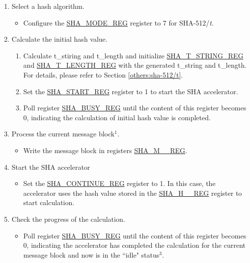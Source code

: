 \begin{enumerate}
    \item \label{others:sha-sel-algorithm2} Select a hash algorithm.
    \begin{itemize}
        \item Configure the \hyperref[regdesc:SHAMODEREG]{SHA\_MODE\_REG} register to 7 for SHA-512/{\it{t}}.
    \end{itemize}
    \item Calculate the initial hash value.
        \begin{enumerate}
            \item Calculate t\_stiring and t\_length and initialize \hyperref[regdesc:SHATSTRINGREG]{SHA\_T\_STRING\_REG} and  \hyperref[regdesc:SHATLENGTHREG]{SHA\_T\_LENGTH\_REG} with the generated t\_string and t\_length. For details, please refer to Section \ref{others:sha-512/t}.
            \item Set the \hyperref[regdesc:SHASTARTREG]{SHA\_START\_REG} register to 1 to start the SHA accelerator.
            \item Poll register \hyperref[regdesc:SHABUSYREG]{SHA\_BUSY\_REG} until the content of this register becomes 0, indicating the calculation of initial hash value is completed.
        \end{enumerate}
    
    \item \label{others:sha-current-block1} Process the current message block\hyperref[others:sha-note-typical-sha]{$^1$}.
    \begin{itemize}
        \item Write the message block in registers \hyperref[regdesc:SHAMNREG]{SHA\_M\_\_REG}.
    \end{itemize}
    \item Start the SHA accelerator 
    \begin{itemize}
        \item Set the \hyperref[regdesc:SHACONTINUEREG]{SHA\_CONTINUE\_REG} register to 1. In this case, the accelerator uses the hash value stored in the \hyperref[regdesc:SHAHNREG]{SHA\_H\_\_REG} register to start calculation.
    \end{itemize}
    
    \item Check the progress of the calculation.
    \begin{itemize}
        \item Poll register \hyperref[regdesc:SHABUSYREG]{SHA\_BUSY\_REG} until the content of this register becomes 0, indicating the accelerator has completed the calculation for the current message block and now is in the ``idle" status\hyperref[others:sha-note-typical-sha]{$^3$}. 
    \end{itemize}
    

\end{enumerate}
